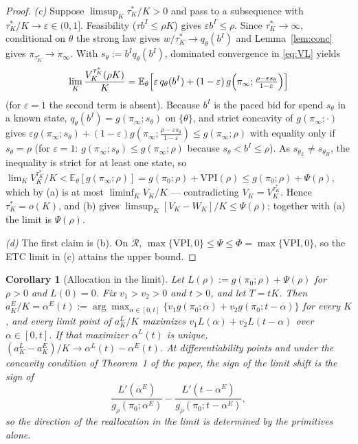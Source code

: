 \documentclass[11pt]{article}
\newtheorem{corollary}{Corollary}
\theoremstyle{definition}
\theoremstyle{remark}
\newcommand{\E}{\mathbb{E}}
\newcommand{\VPI}{\mathrm{VPI}}
\newcommand{\cR}{\mathcal{R}}
\begin{document}
\begin{proof}
\emph{(c)} Suppose $\limsup_K\tau^*_K/K>0$ and pass to a subsequence with $\tau^*_K/K\to\varepsilon\in(0,1]$.
Feasibility ($\tau b^I\le\rho K$) gives $\varepsilon b^I\le\rho$. Since $\tau^*_K\to\infty$, conditional on $\theta$ the
strong law gives $w/\tau^*_K\to q_\theta(b^I)$ and Lemma~\ref{lem:conc} gives $\pi_{\tau^*_K}\to\pi_\infty$. With
$s_\theta:=b^Iq_\theta(b^I)$, dominated convergence in \eqref{eq:VL} yields
\[
\lim_K\frac{V_K^{\tau^*_K}(\rho K)}{K}=\E_\theta\Bigl[\varepsilon\,q_\theta(b^I)+(1-\varepsilon)\,
g\Bigl(\pi_\infty;\tfrac{\rho-\varepsilon s_\theta}{1-\varepsilon}\Bigr)\Bigr]
\]
(for $\varepsilon=1$ the second term is absent). Because $b^I$ is the paced bid for spend $s_\theta$ in a known state,
$q_\theta(b^I)=g(\pi_\infty;s_\theta)$ on $\{\theta\}$, and strict concavity of $g(\pi_\infty;\cdot)$ gives
$\varepsilon g(\pi_\infty;s_\theta)+(1-\varepsilon)g(\pi_\infty;\frac{\rho-\varepsilon s_\theta}{1-\varepsilon})\le g(\pi_\infty;\rho)$
with equality only if $s_\theta=\rho$ (for $\varepsilon=1$: $g(\pi_\infty;s_\theta)\le g(\pi_\infty;\rho)$ because
$s_\theta<b^I\le\rho$). As $s_{\theta_L}\neq s_{\theta_H}$, the inequality is strict for at least one state, so
$\lim_K V_K^{\tau^*_K}/K<\E_\theta[g(\pi_\infty;\rho)]=g(\pi_0;\rho)+\VPI(\rho)\le g(\pi_0;\rho)+\Psi(\rho)$, which by
(a) is at most $\liminf_K V_K/K$ --- contradicting $V_K=V_K^{\tau^*_K}$. Hence $\tau^*_K=o(K)$, and (b) gives
$\limsup_K[V_K-W_K]/K\le\Psi(\rho)$; together with (a) the limit is $\Psi(\rho)$.

\emph{(d)} The first claim is (b). On $\cR$, $\max\{\VPI,0\}\le\Psi\le\Phi=\max\{\VPI,0\}$, so the ETC limit in (c)
attains the upper bound.
\end{proof}

\begin{corollary}[Allocation in the limit]\label{cor:alloc}
Let $L(\rho):=g(\pi_0;\rho)+\Psi(\rho)$ for $\rho>0$ and $L(0)=0$. Fix $v_1>v_2>0$ and $t>0$, and let $T=tK$. Then
$a^E_K/K=\alpha^E(t):=\arg\max_{\alpha\in[0,t]}\{v_1g(\pi_0;\alpha)+v_2g(\pi_0;t-\alpha)\}$ for every $K$, and every
limit point of $a^L_K/K$ maximizes $v_1L(\alpha)+v_2L(t-\alpha)$ over $\alpha\in[0,t]$. If that maximizer
$\alpha^L(t)$ is unique, $(a^L_K-a^E_K)/K\to\alpha^L(t)-\alpha^E(t)$. At differentiability points and under the
concavity condition of Theorem~1 of the paper, the sign of the limit shift is the sign of
\[
\frac{L'(\alpha^E)}{g_\rho(\pi_0;\alpha^E)}-\frac{L'(t-\alpha^E)}{g_\rho(\pi_0;t-\alpha^E)},
\]
so the direction of the reallocation in the limit is determined by the primitives alone.
\end{corollary}
\end{document}
